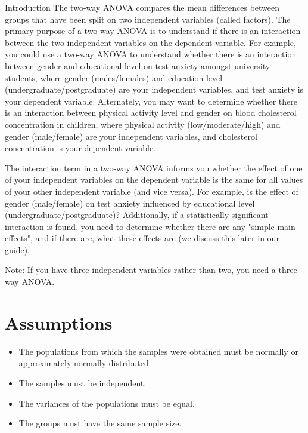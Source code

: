 \documentclass[]{article}
\begin{document}
Introduction
The two-way ANOVA compares the mean differences between groups that have been split on two independent variables (called factors). The primary purpose of a two-way ANOVA is to understand if there is an interaction between the two independent variables on the dependent variable. For example, you could use a two-way ANOVA to understand whether there is an interaction between gender and educational level on test anxiety amongst university students, where gender (males/females) and education level (undergraduate/postgraduate) are your independent variables, and test anxiety is your dependent variable. Alternately, you may want to determine whether there is an interaction between physical activity level and gender on blood cholesterol concentration in children, where physical activity (low/moderate/high) and gender (male/female) are your independent variables, and cholesterol concentration is your dependent variable.

The interaction term in a two-way ANOVA informs you whether the effect of one of your independent variables on the dependent variable is the same for all values of your other independent variable (and vice versa). For example, is the effect of gender (male/female) on test anxiety influenced by educational level (undergraduate/postgraduate)? Additionally, if a statistically significant interaction is found, you need to determine whether there are any "simple main effects", and if there are, what these effects are (we discuss this later in our guide).

Note: If you have three independent variables rather than two, you need a three-way ANOVA.

\section{Assumptions}
\begin{itemize}
\item The populations from which the samples were obtained must be normally or approximately normally distributed.
\item The samples must be independent.
\item The variances of the populations must be equal.
\item The groups must have the same sample size.
\end{itemize}
\end{document}
